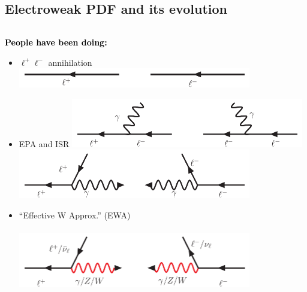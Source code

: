 \documentclass[aspectratio=169]{beamer}
\begin{document}
\subsection{Electroweak PDF and its evolution}
\begin{frame}
	\begin{columns}
		\begin{column}[t]{0.48\textwidth}
			\hspace{3mm}\vspace{1mm}\textcolor{black}{\bf People have been doing: }
			\begin{itemize}
				\item $\ell^+\ell^-$ annihilation
				\includegraphics[width=0.8\textwidth]{figs/mm_collision}
				\item EPA and ISR
				\includegraphics[width=0.8\textwidth]{figs/ISR_collision}
				\includegraphics[width=0.8\textwidth]{figs/EPA_collision}
				\item ``Effective W Approx.'' (EWA)\\
				\\
				\includegraphics[width=0.8\textwidth]{figs/EWA_collision}
			\end{itemize}

\end{column}
\end{columns}
\end{frame}
\end{document}

